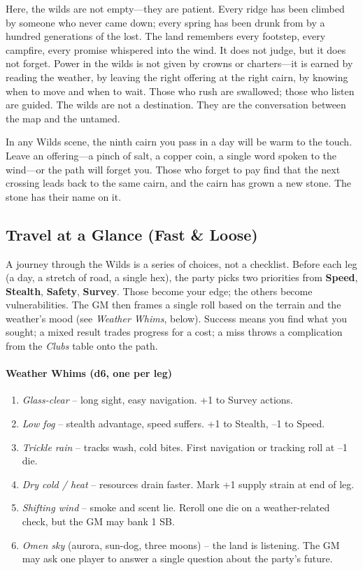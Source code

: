 Here, the wilds are not empty---they are patient. Every ridge has been climbed by someone who never came down; every spring has been drunk from by a hundred generations of the lost. The land remembers every footstep, every campfire, every promise whispered into the wind. It does not judge, but it does not forget. Power in the wilds is not given by crowns or charters---it is earned by reading the weather, by leaving the right offering at the right cairn, by knowing when to move and when to wait. Those who rush are swallowed; those who listen are guided. The wilds are not a destination. They are the conversation between the map and the untamed.

\begin{tcolorbox}[colback=black!3,colframe=red!60!black,title={The Ninth Taboo Manifestation},breakable]
In any Wilds scene, the ninth cairn you pass in a day will be warm to the touch. Leave an offering---a pinch of salt, a copper coin, a single word spoken to the wind---or the path will forget you. Those who forget to pay find that the next crossing leads back to the same cairn, and the cairn has grown a new stone. The stone has their name on it.
\end{tcolorbox}

\subsection*{Travel at a Glance (Fast \& Loose)}
\label{sec:wilderness-travel}

A journey through the Wilds is a series of choices, not a checklist. Before each leg (a day, a stretch of road, a single hex), the party picks two priorities from \textbf{Speed}, \textbf{Stealth}, \textbf{Safety}, \textbf{Survey}. Those become your edge; the others become vulnerabilities. The GM then frames a single roll based on the terrain and the weather's mood (see \emph{Weather Whims}, below). Success means you find what you sought; a mixed result trades progress for a cost; a miss throws a complication from the \emph{Clubs} table onto the path.

\paragraph{Weather Whims (d6, one per leg)}
\begin{enumerate}
\item \emph{Glass-clear} -- long sight, easy navigation. +1 to Survey actions.
\item \emph{Low fog} -- stealth advantage, speed suffers. +1 to Stealth, --1 to Speed.
\item \emph{Trickle rain} -- tracks wash, cold bites. First navigation or tracking roll at --1 die.
\item \emph{Dry cold / heat} -- resources drain faster. Mark +1 supply strain at end of leg.
\item \emph{Shifting wind} -- smoke and scent lie. Reroll one die on a weather-related check, but the GM may bank 1 SB.
\item \emph{Omen sky} (aurora, sun-dog, three moons) -- the land is listening. The GM may ask one player to answer a single question about the party's future.
\end{enumerate}


